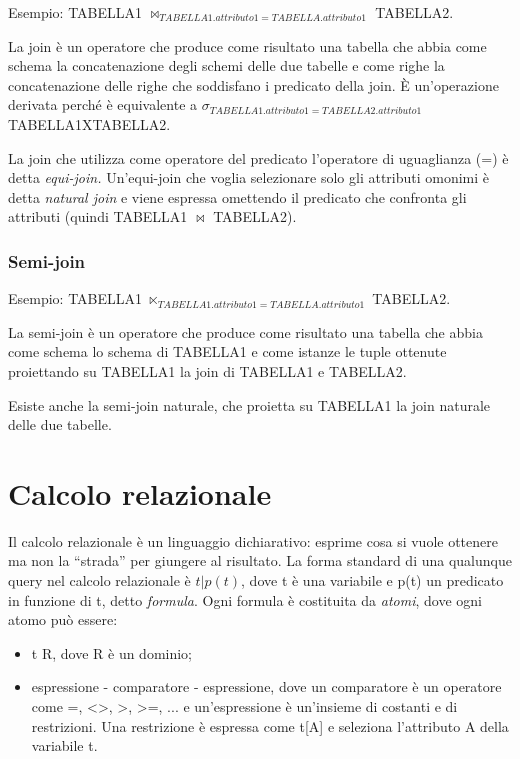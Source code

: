 \documentclass[\main/main.tex]{subfiles}
\begin{document}
Esempio: TABELLA1 $\bowtie_{TABELLA1.attributo1=TABELLA.attributo1}$ TABELLA2.

La join è un operatore che produce come risultato una tabella che abbia come schema la concatenazione degli schemi delle due tabelle e come righe la concatenazione delle righe che soddisfano i predicato della join.
È un'operazione derivata perché è equivalente a $\sigma_{TABELLA1.attributo1=TABELLA2.attributo1}$ TABELLA1XTABELLA2.

La join che utilizza come operatore del predicato l'operatore di uguaglianza (=) è detta \textit{equi-join.}
Un'equi-join che voglia selezionare solo gli attributi omonimi è detta \textit{natural join} e viene espressa omettendo il predicato che confronta gli attributi (quindi TABELLA1 $\bowtie$ TABELLA2).


\subsubsection{Semi-join}

Esempio: TABELLA1 $\ltimes_{TABELLA1.attributo1=TABELLA.attributo1}$ TABELLA2.

La semi-join è un operatore che produce come risultato una tabella che abbia come schema lo schema di TABELLA1 e come istanze le tuple ottenute proiettando su TABELLA1 la join di TABELLA1 e TABELLA2.

Esiste anche la semi-join naturale, che proietta su TABELLA1 la join naturale delle due tabelle.


\section{Calcolo relazionale}
Il calcolo relazionale è un linguaggio dichiarativo: esprime cosa si vuole ottenere ma non la ``strada'' per giungere al risultato.
La forma standard di una qualunque query nel calcolo relazionale è ${ t | p(t) }$, dove t è una variabile e p(t) un predicato in funzione di t, detto \textit{formula}.
Ogni formula è costituita da \textit{atomi}, dove ogni atomo può essere:
\begin{itemize}
  \item t \in R, dove R è un dominio;
  \item espressione - comparatore - espressione, dove un comparatore è un operatore come =, <>, >, >=, ... e un'espressione è un'insieme di costanti e di restrizioni. Una restrizione è espressa come t[A] e seleziona l'attributo A della variabile t.
\end{itemize}
\end{document}
